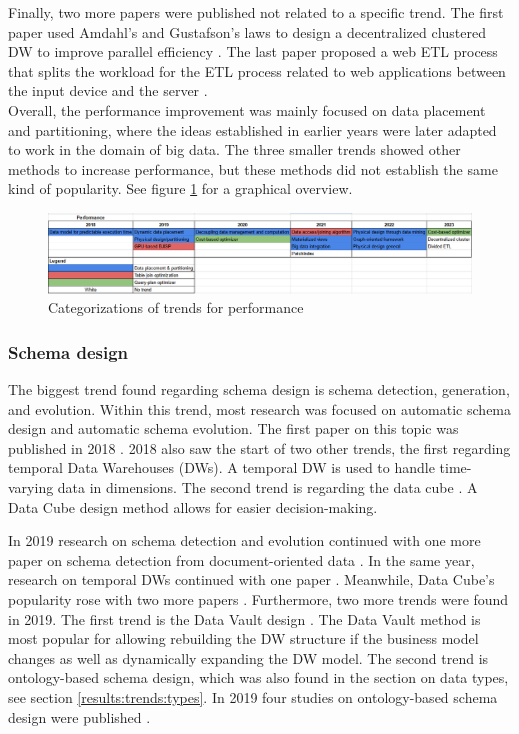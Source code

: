 \documentclass[11pt]{article}
\begin{document}
Finally, two more papers were published not related to a specific trend. The first paper used Amdahl's and Gustafson's laws to design a decentralized clustered DW to improve parallel efficiency \cite{Raman2023343}. The last paper proposed a web ETL process that splits the workload for the ETL process related to web applications between the input device and the server \cite{AbdAl-Rahman2023765}. \\

Overall, the performance improvement was mainly focused on data placement and partitioning, where the ideas established in earlier years were later adapted to work in the domain of big data. The three smaller trends showed other methods to increase performance, but these methods did not establish the same kind of popularity. See figure \ref{fig:performance} for a graphical overview. \\

\begin{figure}
\centering
\includegraphics[scale=0.5]{Images/performance.png}
\caption{Categorizations of trends for performance}
\label{fig:performance}
\end{figure}

\subsubsection{Schema design}
\label{results:trends:schema}
The biggest trend found regarding schema design is schema detection, generation, and evolution. Within this trend, most research was focused on automatic schema design and automatic schema evolution. The first paper on this topic was published in 2018 \cite{Taktak2018401}. 2018 also saw the start of two other trends, the first regarding temporal Data Warehouses (DWs)\cite{Gosain2018357}. A temporal DW is used to handle time-varying data in dimensions. The second trend is regarding the data cube \cite{Bantug2018}. A Data Cube design method allows for easier decision-making.

In 2019 research on schema detection and evolution continued with one more paper on schema detection from document-oriented data \cite{Bouaziz2019221}. In the same year, research on temporal DWs continued with one paper \cite{AinElHayat2019314}. Meanwhile, Data Cube's popularity rose with two more papers \cite{Djiroun2019783, Brahmi2019153}. Furthermore, two more trends were found in 2019. The first trend is the Data Vault design \cite{Kuznetcov2019}. The Data Vault method is most popular for allowing rebuilding the DW structure if the business model changes as well as dynamically expanding the DW model. The second trend is ontology-based schema design, which was also found in the section on data types, see section \ref{results:trends:types}. In 2019 four studies on ontology-based schema design were published \cite{Zekri2019273, Zekri2019285, Zekri20191190, Elamin2019}. \\
\end{document}
